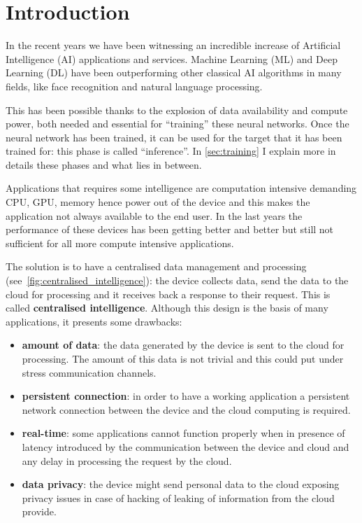 \chapter{Introduction}
In the recent years we have been witnessing an incredible increase of
Artificial Intelligence (AI) applications and services.
Machine Learning (ML) and Deep Learning (DL) have been outperforming other
classical AI algorithms in many fields, like face recognition and natural
language processing.

This has been possible thanks to the explosion of data availability and compute
power, both needed and essential for ``training'' these neural networks.
Once the neural network has been trained, it can be used for the target that it
has been trained for: this phase is called ``inference''.
In \autoref{sec:training} I explain more in details these phases and what lies
in between.

Applications that requires some intelligence are computation intensive
demanding CPU, GPU, memory hence power out of the device and this makes the
application not always available to the end user.
In the last years the performance of these devices has been getting better and
better but still not sufficient for all more compute intensive applications.

The solution is to have a centralised data management and processing
(see~\ref{fig:centralised_intelligence}): the device collects data, send the
data to the cloud for processing and it receives back a response to their
request. This is called \textbf{centralised intelligence}.
Although this design is the basis of many applications, it presents some
drawbacks:
\begin{itemize}
    \item \textbf{amount of data}: the data generated by the device is sent to
        the cloud for processing. The amount of this data is not trivial and
        this could put under stress communication channels.
    \item \textbf{persistent connection}: in order to have a working
        application a persistent network connection between the device and the
        cloud computing is required.
    \item \textbf{real-time}: some applications cannot function properly when
        in presence of latency introduced by the communication between the
        device and cloud and any delay in processing the request by the cloud.
    \item \textbf{data privacy}: the device might send personal data to the
        cloud exposing privacy issues in case of hacking of leaking of
        information from the cloud provide.
\end{itemize}

